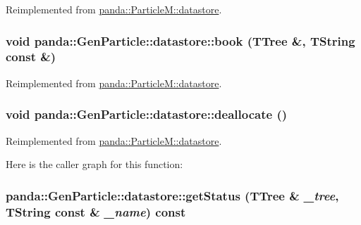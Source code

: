 Reimplemented from \hyperlink{structpanda_1_1ParticleM_1_1datastore_aafc17a88cf8425ff45a00b5fd2eb5751}{panda::ParticleM::datastore}.\hypertarget{structpanda_1_1GenParticle_1_1datastore_a115b560e4e4ecfa3d7c0a2fbbcafe5b9}{
\subsubsection[{book}]{\setlength{\rightskip}{0pt plus 5cm}void panda::GenParticle::datastore::book (TTree \&, \/  TString const \&)}}
\label{structpanda_1_1GenParticle_1_1datastore_a115b560e4e4ecfa3d7c0a2fbbcafe5b9}


Reimplemented from \hyperlink{structpanda_1_1ParticleM_1_1datastore_ae2eb76ca042d8b3e899c027ee07b5860}{panda::ParticleM::datastore}.\hypertarget{structpanda_1_1GenParticle_1_1datastore_afe415117bf9f06e163aff5e341c9ef00}{
\subsubsection[{deallocate}]{\setlength{\rightskip}{0pt plus 5cm}void panda::GenParticle::datastore::deallocate ()}}
\label{structpanda_1_1GenParticle_1_1datastore_afe415117bf9f06e163aff5e341c9ef00}


Reimplemented from \hyperlink{structpanda_1_1ParticleM_1_1datastore_a85c4ce11f1d7c6944a525ad2488880aa}{panda::ParticleM::datastore}.

Here is the caller graph for this function:\hypertarget{structpanda_1_1GenParticle_1_1datastore_af83451f0c94efe8daeb7769571e81aef}{
\subsubsection[{getStatus}]{ panda::GenParticle::datastore::getStatus (TTree \& {\em \_\-tree}, \/  TString const \& {\em \_\-name}) const}}
\label{structpanda_1_1GenParticle_1_1datastore_af83451f0c94efe8daeb7769571e81aef}


